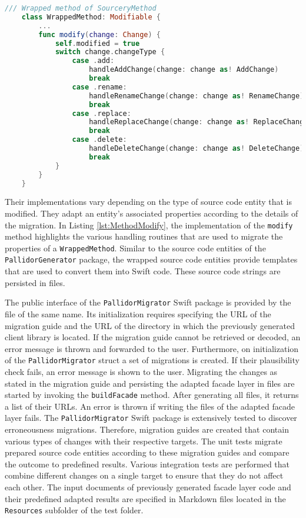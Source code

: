 \begin{lstlisting}[language=Swift, caption={Modification of a changed method entity}, captionpos=b, label={lst:MethodModify}]
	/// Wrapped method of SourceryMethod
	class WrappedMethod: Modifiable {
		...
		func modify(change: Change) {
			self.modified = true
			switch change.changeType {
				case .add:
					handleAddChange(change: change as! AddChange)
					break
				case .rename:
					handleRenameChange(change: change as! RenameChange)
					break
				case .replace:
					handleReplaceChange(change: change as! ReplaceChange)
					break
				case .delete:
					handleDeleteChange(change: change as! DeleteChange)
					break
			}
		}
	}
\end{lstlisting}

Their implementations vary depending on the type of source code entity that is modified. They adapt an entity's associated properties according to the details of the migration. In Listing \ref{lst:MethodModify}, the implementation of the \texttt{modify} method highlights the various handling routines that are used to migrate the properties of a \texttt{WrappedMethod}. Similar to the source code entities of the \texttt{PallidorGenerator} package, the wrapped source code entities provide templates that are used to convert them into Swift code. These source code strings are persisted in files.

The public interface of the \texttt{PallidorMigrator} Swift package is provided by the file of the same name. Its initialization requires specifying the URL of the migration guide and the URL of the directory in which the previously generated client library is located. If the migration guide cannot be retrieved or decoded, an error message is thrown and forwarded to the user. Furthermore, on initialization of the \texttt{PallidorMigrator} struct a set of migrations is created. If their plausibility check fails, an error message is shown to the user. Migrating the changes as stated in the migration guide and persisting the adapted facade layer in files are started by invoking the \texttt{buildFacade} method. After generating all files, it returns a list of their URLs. An error is thrown if writing the files of the adapted facade layer fails. The \texttt{PallidorMigrator} Swift package is extensively tested to discover erroneousness migrations. Therefore, migration guides are created that contain various types of changes with their respective targets. The unit tests migrate prepared source code entities according to these migration guides and compare the outcome to predefined results. Various integration tests are performed that combine different changes on a single target to ensure that they do not affect each other. The input documents of previously generated facade layer code and their predefined adapted results are specified in Markdown files located in the \texttt{Resources} subfolder of the test folder. 

